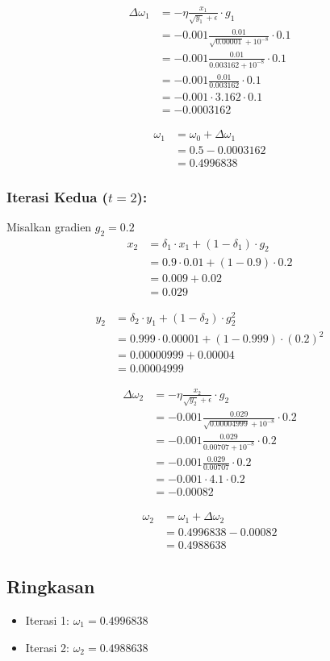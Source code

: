 \begin{align}
    \Delta \omega_1 &= -\eta \frac{x_1}{\sqrt{y_1} + \epsilon} \cdot g_1 \nonumber \\
    &= -0.001 \frac{0.01}{\sqrt{0.00001} + 10^{-8}} \cdot 0.1 \nonumber \\
    &= -0.001 \frac{0.01}{0.003162 + 10^{-8}} \cdot 0.1 \nonumber \\
    &= -0.001 \frac{0.01}{0.003162} \cdot 0.1 \nonumber \\
    &= -0.001 \cdot 3.162 \cdot 0.1 \nonumber \\
    &= -0.0003162
\end{align}

\begin{align}
    \omega_1 &= \omega_0 + \Delta \omega_1 \nonumber \\
    &= 0.5 - 0.0003162 \nonumber \\
    &= 0.4996838
\end{align}

\subsubsection*{Iterasi Kedua ($t=2$):}
Misalkan gradien $g_2 = 0.2$
\begin{align}
    x_2 &= \delta_1 \cdot x_1 + (1 - \delta_1) \cdot g_2 \nonumber \\
    &= 0.9 \cdot 0.01 + (1 - 0.9) \cdot 0.2 \nonumber \\
    &= 0.009 + 0.02 \nonumber \\
    &= 0.029
\end{align}

\begin{align}
    y_2 &= \delta_2 \cdot y_1 + (1 - \delta_2) \cdot g_2^2 \nonumber \\
    &= 0.999 \cdot 0.00001 + (1 - 0.999) \cdot (0.2)^2 \nonumber \\
    &= 0.00000999 + 0.00004 \nonumber \\
    &= 0.00004999
\end{align}

\begin{align}
    \Delta \omega_2 &= -\eta \frac{x_2}{\sqrt{y_2} + \epsilon} \cdot g_2 \nonumber \\
    &= -0.001 \frac{0.029}{\sqrt{0.00004999} + 10^{-8}} \cdot 0.2 \nonumber \\
    &= -0.001 \frac{0.029}{0.00707 + 10^{-8}} \cdot 0.2 \nonumber \\
    &= -0.001 \frac{0.029}{0.00707} \cdot 0.2 \nonumber \\
    &= -0.001 \cdot 4.1 \cdot 0.2 \nonumber \\
    &= -0.00082
\end{align}

\begin{align}
    \omega_2 &= \omega_1 + \Delta \omega_2 \nonumber \\
    &= 0.4996838 - 0.00082 \nonumber \\
    &= 0.4988638
\end{align}

\subsection*{Ringkasan}
\begin{itemize}
    \item Iterasi 1: $\omega_1 = 0.4996838$
    \item Iterasi 2: $\omega_2 = 0.4988638$
\end{itemize}
